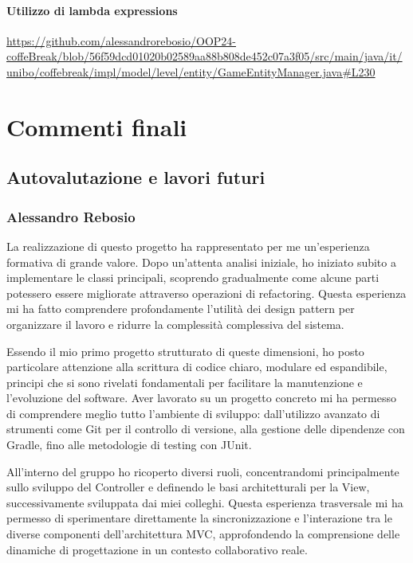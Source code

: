 \documentclass[a4paper,12pt]{report}
\begin{document}
\subsubsection{Utilizzo di lambda expressions}
\begin{sloppypar}
	\raggedright
	\url{https://github.com/alessandrorebosio/OOP24-coffeBreak/blob/56f59dcd01020b02589aa88b808de452c07a3f05/src/main/java/it/unibo/coffebreak/impl/model/level/entity/GameEntityManager.java#L230}
\end{sloppypar}
\chapter{Commenti finali}
\section{Autovalutazione e lavori futuri}
\subsection{Alessandro Rebosio}
La realizzazione di questo progetto ha rappresentato per me un'esperienza formativa di grande valore. Dopo un'attenta analisi iniziale, ho iniziato subito a implementare le classi principali, scoprendo gradualmente come alcune parti potessero essere migliorate attraverso operazioni di refactoring. Questa esperienza mi ha fatto comprendere profondamente l'utilità dei design pattern per organizzare il lavoro e ridurre la complessità complessiva del sistema.

Essendo il mio primo progetto strutturato di queste dimensioni, ho posto particolare attenzione alla scrittura di codice chiaro, modulare ed espandibile, principi che si sono rivelati fondamentali per facilitare la manutenzione e l'evoluzione del software. Aver lavorato su un progetto concreto mi ha permesso di comprendere meglio tutto l'ambiente di sviluppo: dall'utilizzo avanzato di strumenti come Git per il controllo di versione, alla gestione delle dipendenze con Gradle, fino alle metodologie di testing con JUnit.

All'interno del gruppo ho ricoperto diversi ruoli, concentrandomi principalmente sullo sviluppo del Controller e definendo le basi architetturali per la View, successivamente sviluppata dai miei colleghi. Questa esperienza trasversale mi ha permesso di sperimentare direttamente la sincronizzazione e l'interazione tra le diverse componenti dell'architettura MVC, approfondendo la comprensione delle dinamiche di progettazione in un contesto collaborativo reale.
\end{document}
